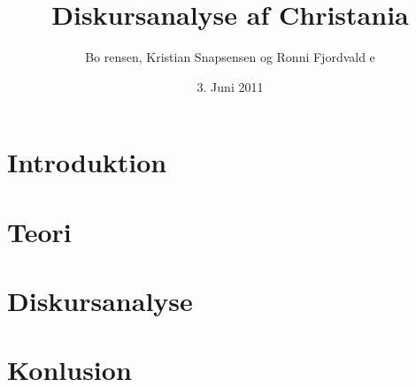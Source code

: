 \documentclass[10pt, a4paper, twoside, danish]{report}
\author{Bo rensen, Kristian Snapsensen og Ronni Fjordvald e}
\date{3. Juni 2011}
\title{Diskursanalyse af Christania}
\begin{document}
\maketitle

\cleardoublepage

\cleardoublepage

\cleardoublepage
\tableofcontents
\thispagestyle{empty}
\cleardoublepage

\chapter{Introduktion}{}\label{chap:introduktion}\newpage


\clearpage
\newpage
\thispagestyle{empty}
\cleardoublepage
\newpage


\chapter{Teori}{}\label{chap:teori}\newpage


\clearpage
\newpage
\thispagestyle{empty}
\cleardoublepage
\newpage


\chapter{Diskursanalyse}{}\label{chap:diskursanalyse}\newpage


\clearpage
\newpage
\thispagestyle{empty}
\cleardoublepage
\newpage



\chapter{Konlusion}{}\label{chap:konklusion}\newpage


\clearpage
\newpage
\thispagestyle{empty}
\cleardoublepage
\newpage


%







\small{
\renewcommand{\bibname}{Referencer}

}
\clearpage
\newpage
\thispagestyle{empty}
\cleardoublepage
\newpage
\end{document}
